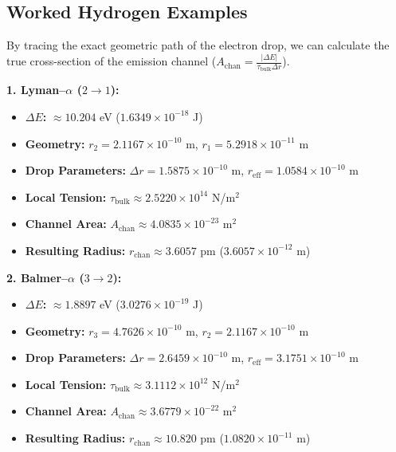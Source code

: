 \subsection{Worked Hydrogen Examples}
By tracing the exact geometric path of the electron drop, we can calculate the true cross-section of the emission channel ($A_{\mathrm{chan}} = \frac{|\Delta E|}{\tau_{\mathrm{bulk}} \Delta r}$).

\vspace{0.2cm}
\noindent \textbf{1. Lyman--$\alpha$ ($2 \to 1$):}
\begin{itemize}
    \item \textbf{$\Delta E$:} $\approx 10.204$ eV \quad ($1.6349 \times 10^{-18}$ J)
    \item \textbf{Geometry:} $r_2 = 2.1167 \times 10^{-10}$ m, \quad $r_1 = 5.2918 \times 10^{-11}$ m
    \item \textbf{Drop Parameters:} $\Delta r = 1.5875 \times 10^{-10}$ m, \quad $r_{\mathrm{eff}} = 1.0584 \times 10^{-10}$ m
    \item \textbf{Local Tension:} $\tau_{\mathrm{bulk}} \approx 2.5220 \times 10^{14}$ N/m$^2$
    \item \textbf{Channel Area:} $A_{\mathrm{chan}} \approx 4.0835 \times 10^{-23}$ m$^2$
    \item \textbf{Resulting Radius:} $r_{\mathrm{chan}} \approx 3.6057$ pm \quad ($3.6057 \times 10^{-12}$ m)
\end{itemize}

\vspace{0.2cm}
\noindent \textbf{2. Balmer--$\alpha$ ($3 \to 2$):}
\begin{itemize}
    \item \textbf{$\Delta E$:} $\approx 1.8897$ eV \quad ($3.0276 \times 10^{-19}$ J)
    \item \textbf{Geometry:} $r_3 = 4.7626 \times 10^{-10}$ m, \quad $r_2 = 2.1167 \times 10^{-10}$ m
    \item \textbf{Drop Parameters:} $\Delta r = 2.6459 \times 10^{-10}$ m, \quad $r_{\mathrm{eff}} = 3.1751 \times 10^{-10}$ m
    \item \textbf{Local Tension:} $\tau_{\mathrm{bulk}} \approx 3.1112 \times 10^{12}$ N/m$^2$
    \item \textbf{Channel Area:} $A_{\mathrm{chan}} \approx 3.6779 \times 10^{-22}$ m$^2$
    \item \textbf{Resulting Radius:} $r_{\mathrm{chan}} \approx 10.820$ pm \quad ($1.0820 \times 10^{-11}$ m)
\end{itemize}

